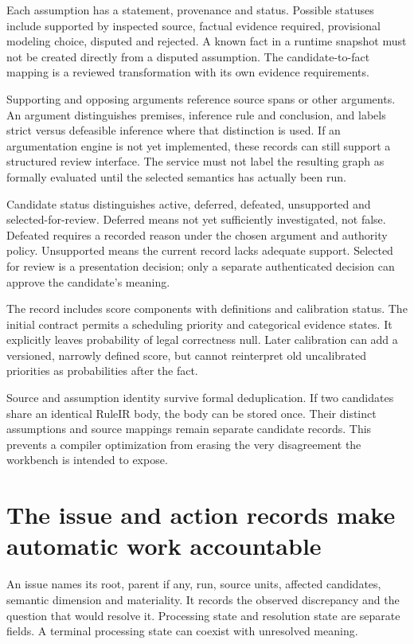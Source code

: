 Each assumption has a statement, provenance and status. Possible statuses include
supported by inspected source, factual evidence required, provisional modeling
choice, disputed and rejected. A known fact in a runtime snapshot must not be
created directly from a disputed assumption. The candidate-to-fact mapping is a
reviewed transformation with its own evidence requirements.

Supporting and opposing arguments reference source spans or other arguments.
An argument distinguishes premises, inference rule and conclusion, and labels
strict versus defeasible inference where that distinction is used. If an
argumentation engine is not yet implemented, these records can still support a
structured review interface. The service must not label the resulting graph as
formally evaluated until the selected semantics has actually been run.

Candidate status distinguishes active, deferred, defeated, unsupported and
selected-for-review. Deferred means not yet sufficiently investigated, not false.
Defeated requires a recorded reason under the chosen argument and authority
policy. Unsupported means the current record lacks adequate support. Selected
for review is a presentation decision; only a separate authenticated decision can
approve the candidate's meaning.

The record includes score components with definitions and calibration status.
The initial contract permits a scheduling priority and categorical evidence
states. It explicitly leaves probability of legal correctness null. Later
calibration can add a versioned, narrowly defined score, but cannot reinterpret
old uncalibrated priorities as probabilities after the fact.

Source and assumption identity survive formal deduplication. If two candidates
share an identical RuleIR body, the body can be stored once. Their distinct
assumptions and source mappings remain separate candidate records. This prevents
a compiler optimization from erasing the very disagreement the workbench is
intended to expose.

\section{The issue and action records make automatic work accountable}
\label{merge:M08:04}


An issue names its root, parent if any, run, source units, affected candidates,
semantic dimension and materiality. It records the observed discrepancy and the
question that would resolve it. Processing state and resolution state are separate
fields. A terminal processing state can coexist with unresolved meaning.

